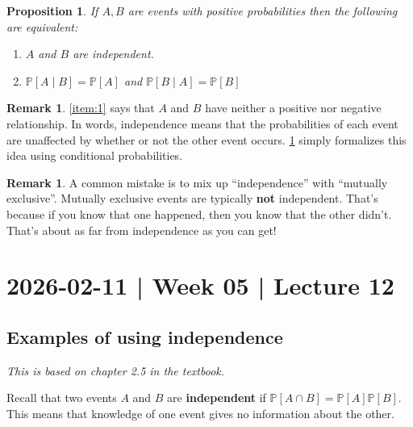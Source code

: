 \documentclass[10pt]{article}
\newtheorem{proposition}[theorem]{Proposition}
\theoremstyle{definition}
\newtheorem{remark}[theorem]{Remark}
\newtheorem{example}[theorem]{Example}
\renewenvironment{example}
{\begin{oldexample}}
  {\par\smallskip\hfill   End of Example~\theexample. $\square$    \par\end{oldexample}}
\newcommand{\1}[1]{\textbf{1}_{\left[#1\right]}} %
\def\P{\mathbb{P}} %
\begin{document}
\begin{proposition}
  \label{prop:independence-interpretation}
  If $A,B$ are events with positive probabilities then the following are
  equivalent:
  \begin{enumerate}[label=\rm{(\roman*.)}]
    \item $A$ and $B$ are independent.
    \item \label{item:1} $\P\left[A\mid B \right] = \P\left[A \right]$
    and $\P\left[B\mid A \right] = \P\left[B \right]$ 
  \end{enumerate}
\end{proposition}
\begin{remark}
  \ref{item:1} says that $A$ and $B$ have neither a positive nor negative
  relationship. In words, independence means that the probabilities of each
  event are unaffected by whether or not the other event occurs.
  \cref{prop:independence-interpretation} simply formalizes this idea using
  conditional probabilities.
\end{remark}

\begin{remark}
  A common mistake is to mix up ``independence'' with ``mutually exclusive''.
  Mutually exclusive events are typically \textbf{not} independent. That's because if
  you know that one happened, then you know that the other didn't. That's
  about as far from independence as you can get!
\end{remark}

\newpage
\section{2026-02-11 | Week 05 | Lecture 12}

\subsection{Examples of using independence}
\textit{This is based on chapter 2.5 in the textbook.}

Recall that two events $A$ and $B$ are \textbf{independent} if
$\P\left[A\cap B \right]=\P\left[A \right]\P\left[B \right]$. This means that knowledge of one event gives no information about the other.

\end{document}
